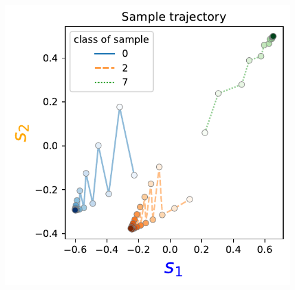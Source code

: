 \begin{frame}{\subsecname}
\begin{minipage}{\textwidth}
\begin{minipage}{0.59\textwidth}
    \end{minipage}
    \hfill
    \begin{minipage}{0.4\textwidth}
        \includegraphics[width=0.95\textwidth]{img/echo_sample_traj}
    \end{minipage}
\end{minipage}

\end{frame}

